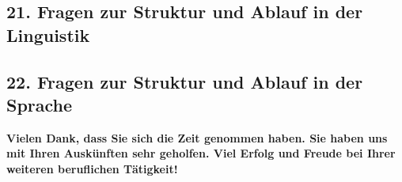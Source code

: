 \documentclass[a4paper,10pt]{article}
\begin{document}
{

\pagebreak


\subsection*{21. Fragen zur Struktur und Ablauf in der Linguistik}



\pagebreak


\subsection*{22. Fragen zur Struktur und Ablauf in der Sprache}




\bigskip

\begin{flushleft}
\textbf{Vielen Dank, dass Sie sich die Zeit genommen haben. Sie haben uns mit Ihren Auskünften sehr geholfen. Viel Erfolg und Freude bei Ihrer weiteren beruflichen Tätigkeit!}
\end{flushleft}

\newpage
\quad  %

}
\end{document}
